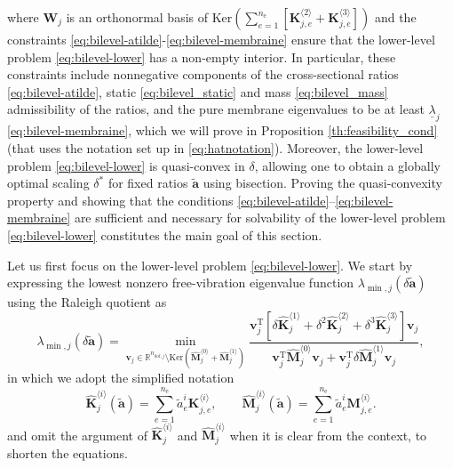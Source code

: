 \documentclass[final,onefignum,onetabnum]{siamart220329}
\begin{document}
%
where $\mathbf{W}_j$ is an orthonormal basis of $\mathrm{Ker}\left(\sum_{e=1}^{n_\mathrm{e}}\left[\mathbf{K}_{j,e}^{\langle 2\rangle} + \mathbf{K}_{j,e}^{\langle 3\rangle}\right]\right)$ and the constraints \eqref{eq:bilevel-atilde}-\eqref{eq:bilevel-membraine} ensure that the lower-level problem \eqref{eq:bilevel-lower} {has a non-empty interior}. In particular, these {constraints} include nonnegative components of the cross-sectional ratios \eqref{eq:bilevel-atilde}, static \eqref{eq:bilevel_static} and mass \eqref{eq:bilevel_mass} admissibility of the ratios, and the pure membrane eigenvalues to be at least $\underline{\lambda}_j$ \eqref{eq:bilevel-membraine}, which we will prove in Proposition \ref{th:feasibility_cond} (that uses the notation set up in \eqref{eq:hatnotation}). Moreover, the lower-level problem \eqref{eq:bilevel-lower} is quasi-convex in $\delta$, allowing one to obtain a globally optimal scaling $\delta^*$ for fixed ratios $\tilde{\mathbf{a}}$ using bisection. Proving the quasi-convexity property and showing that the conditions \eqref{eq:bilevel-atilde}--\eqref{eq:bilevel-membraine} are sufficient and necessary for solvability of the lower-level problem \eqref{eq:bilevel-lower} constitutes the main goal of this section.

Let us first focus on the lower-level problem \eqref{eq:bilevel-lower}. We start by expressing the lowest nonzero
free-vibration eigenvalue function $\lambda_{\min,j}(\delta \tilde{\mathbf{a}})$ using the Raleigh quotient \cite[Definition 2.2 and Appendix A.1]{Achtziger2008} as
%
\begin{equation}\label{eq:RQ}
	\lambda_{\min,j}(\delta \tilde{\mathbf{a}}) = \min_{\mathbf{v}_j \in \mathbb{R}^{n_{\mathrm{dof},j}}\setminus \mathrm{Ker}\left(\hat{\mathbf{M}}_j^{\langle 0\rangle} + \hat{\mathbf{M}}_j^{\langle 1\rangle}\right)} \frac{\mathbf{v}_j^\mathrm{T} \left[\delta\hat{\mathbf{K}}_j^{\langle 1\rangle} + \delta^2\hat{\mathbf{K}}_j^{\langle 2\rangle} + \delta^3\hat{\mathbf{K}}_j^{\langle 3\rangle} \right]  \mathbf{v}_j}{\mathbf{v}_j^\mathrm{T} \hat{\mathbf{M}}_j^{\langle 0\rangle} \mathbf{v}_j + \mathbf{v}_j^\mathrm{T} \delta\hat{\mathbf{M}}_j^{\langle 1\rangle} \mathbf{v}_j},
\end{equation}
%
in which we adopt the simplified notation
%
\begin{equation}\label{eq:hatnotation}
	\hat{\mathbf{K}}_j^{\langle i\rangle}(\tilde{\mathbf{a}}) = \sum_{e=1}^{n_\mathrm{e}}\tilde{a}_e^i\mathbf{K}_{j,e}^{\langle i\rangle}, \qquad 
	\hat{\mathbf{M}}_j^{\langle i\rangle}(\tilde{\mathbf{a}}) = \sum_{e=1}^{n_\mathrm{e}}\tilde{a}_e^i \mathbf{M}_{j,e}^{\langle i\rangle}.
\end{equation}
%
and omit the argument of $\hat{\mathbf{K}}_j^{\langle i\rangle}$ and $\hat{\mathbf{M}}_j^{\langle i\rangle}$ 
when it is clear from the context, to shorten the equations.
\end{document}

